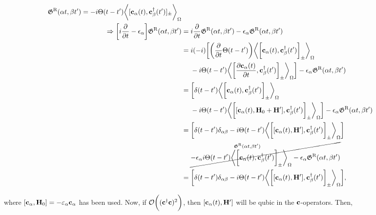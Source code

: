 \documentclass{homework}
\begin{document}
\begin{equation*} \begin{split}
    \mathfrak{G}^{\textnormal{R}}(\alpha t, \beta t') = -i \Theta(t-t') \bigg\langle [{\bf c}_{\alpha}(t),{\bf c}_{\beta}^\dagger(t') ]_{\pm}\bigg\rangle_{\Omega} \\
    \Rightarrow \bigg[i \frac{\partial}{ \partial t} - \epsilon_{\alpha}\bigg] \mathfrak{G}^{\textnormal{R}}(\alpha t, \beta t') &= i \frac{\partial}{ \partial t}\mathfrak{G}^{\textnormal{R}}(\alpha t, \beta t') - \epsilon_{\alpha}\mathfrak{G}^{\textnormal{R}}(\alpha t, \beta t') \\
    &= i (-i) \bigg[\bigg(\frac{\partial}{ \partial t} \Theta(t-t')\bigg) \bigg\langle\bigg[{\bf c}_{\alpha}(t),{\bf c}_{\beta}^\dagger(t') \bigg]_{\pm}\bigg\rangle_{\Omega} \\
    & \textnormal{ } \textnormal{ } \textnormal{ } \textnormal{ }- i\Theta(t-t') \bigg\langle\bigg[\frac{\partial{\bf c}_{\alpha}(t)}{\partial t},{\bf c}_{\beta}^\dagger(t') \bigg]_{\pm}\bigg\rangle_{\Omega} \bigg]- \epsilon_{\alpha}\mathfrak{G}^{\textnormal{R}}(\alpha t, \beta t') \\
    &= \bigg[\delta(t-t') \bigg\langle\bigg[{\bf c}_{\alpha}(t),{\bf c}_{\beta}^\dagger(t') \bigg]_{\pm}\bigg\rangle_{\Omega} \\
    & \textnormal{ } \textnormal{ } \textnormal{ } \textnormal{ }- i\Theta(t-t') \bigg\langle\bigg[[{\bf c}_{\alpha}(t), {\bf H}_0 + {\bf H'}],{\bf c}_{\beta}^\dagger(t') \bigg]_{\pm}\bigg\rangle_{\Omega} \bigg]- \epsilon_{\alpha}\mathfrak{G}^{\textnormal{R}}(\alpha t, \beta t') \\
    &= \bigg[\delta(t-t') \delta_{\alpha \beta} - i \Theta(t-t') \bigg\langle\bigg[[{\bf c}_{\alpha}(t), {\bf H'}], {\bf c}_{\beta}^\dagger(t') \bigg]_{\pm}\bigg\rangle_{\Omega} \bigg]  \\
    & \textnormal{ } \textnormal{ } \textnormal{ } \textnormal{ } \cancel{- \epsilon_{\alpha} \overset{\mathfrak{G}^{\textnormal{R}}(\alpha t, \beta t')}{i  \Theta(t-t')\bigg\langle\bigg[{{\bf c}_{\alpha}(t)},{\bf c}_{\beta}^\dagger(t') \bigg]_{\pm}\bigg\rangle_{\Omega}} - \epsilon_{\alpha} \mathfrak{G}^{\textnormal{R}}(\alpha t, \beta t')} \\
    &= \bigg[\delta(t-t') \delta_{\alpha \beta} - i \Theta(t-t') \bigg\langle\bigg[[{\bf c}_{\alpha}(t), {\bf H'}], {\bf c}_{\beta}^\dagger(t') \bigg]_{\pm}\bigg\rangle_{\Omega} \bigg],
\end{split}
\end{equation*}

where $[{\bf c}_{\alpha}, {\bf H}_0] = -\varepsilon_{\alpha} {\bf c}_{\alpha}$ has been used. 
Now, if $\mathcal{O}\bigg(({{\bf c}}^\dagger {{\bf c}})^2\bigg)$, then $[{\bf c}_{\alpha}(t), {\bf H}']$ will be qubic in the ${\bf c}$-operators. Then, 
\end{document}
